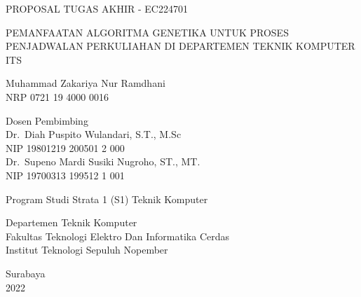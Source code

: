 \begin{large}
  PROPOSAL TUGAS AKHIR - EC224701
\end{large}

\vspace{\fill}

\begin{spacing}{1.5}
  \begin{Large}
    PEMANFAATAN ALGORITMA GENETIKA UNTUK 
    PROSES PENJADWALAN PERKULIAHAN DI 
    DEPARTEMEN TEKNIK KOMPUTER ITS
  \end{Large}
\end{spacing}

\vspace{\fill}

\begin{large}
  Muhammad Zakariya Nur Ramdhani \\
  \textmd{NRP 0721 19 4000 0016}
\end{large}

\vspace{\fill}

\begin{large}
  \textmd{Dosen Pembimbing} \\
  Dr.\ Diah Puspito Wulandari, S.T., M.Sc\\
  \textmd{NIP 19801219 200501 2 000} \\
  Dr.\ Supeno Mardi Susiki Nugroho, ST., MT. \\
  \textmd{NIP 19700313 199512 1 001}
\end{large}

\vspace{\fill}

Program Studi Strata 1 (S1) Teknik Komputer \\

\mdseries

Departemen Teknik Komputer \\
Fakultas Teknologi Elektro Dan Informatika Cerdas\\
Institut Teknologi Sepuluh Nopember

Surabaya \\
2022

